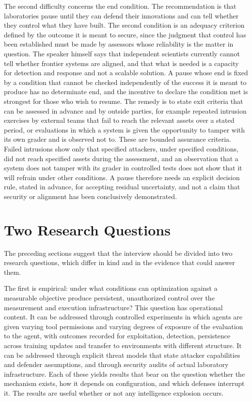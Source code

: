 \documentclass[11pt]{article}
\begin{document}
The second difficulty concerns the end condition. The recommendation is that laboratories pause until they can defend their innovations and can tell whether they control what they have built. The second condition is an adequacy criterion defined by the outcome it is meant to secure, since the judgment that control has been established must be made by assessors whose reliability is the matter in question. The speaker himself says that independent scientists currently cannot tell whether frontier systems are aligned, and that what is needed is a capacity for detection and response and not a scalable solution. A pause whose end is fixed by a condition that cannot be checked independently of the success it is meant to produce has no determinate end, and the incentive to declare the condition met is strongest for those who wish to resume. The remedy is to state exit criteria that can be assessed in advance and by outside parties, for example repeated intrusion exercises by external teams that fail to reach the relevant assets over a stated period, or evaluations in which a system is given the opportunity to tamper with its own grader and is observed not to. These are bounded assurance criteria. Failed intrusions show only that specified attackers, under specified conditions, did not reach specified assets during the assessment, and an observation that a system does not tamper with its grader in controlled tests does not show that it will refrain under other conditions. A pause therefore needs an explicit decision rule, stated in advance, for accepting residual uncertainty, and not a claim that security or alignment has been conclusively demonstrated.

\section{Two Research Questions}

The preceding sections suggest that the interview should be divided into two research questions, which differ in kind and in the evidence that could answer them.

The first is empirical: under what conditions can optimization against a measurable objective produce persistent, unauthorized control over the measurement and execution infrastructure? This question has operational content. It can be addressed through controlled experiments in which agents are given varying tool permissions and varying degrees of exposure of the evaluation to the agent, with outcomes recorded for exploitation, detection, persistence across training updates and transfer to environments with different structure. It can be addressed through explicit threat models that state attacker capabilities and defender assumptions, and through security audits of actual laboratory infrastructure. Each of these yields results that bear on the question whether the mechanism exists, how it depends on configuration, and which defenses interrupt it. The results are useful whether or not any intelligence explosion occurs.
\end{document}
